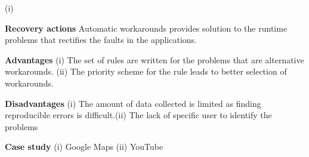 \begin{compactitem}
(i)
\item[\textbf{Recovery actions}]Automatic workarounds provides solution to the runtime problems that rectifies the faults in the applications.
\item[\textbf{Advantages}](i) The set of rules are written for the problems that are alternative workarounds. (ii) The priority scheme for the rule leads to better selection of workarounds.
\item[\textbf{Disadvantages}] (i) The amount of data collected is limited as finding reproducible errors is difficult.(ii) The lack of specific user to identify the problems \item[\textbf{Case study}] (i) Google Maps (ii) YouTube \end{compactitem}
